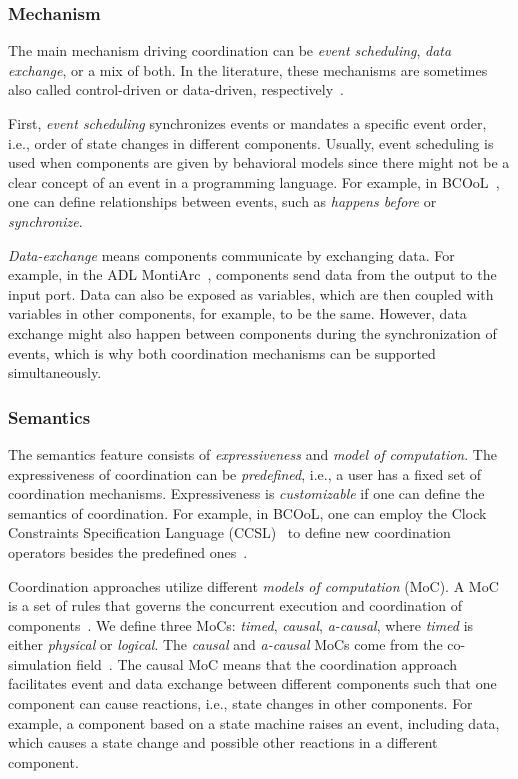 \documentclass[runningheads]{llncs}
\begin{document}
\subsubsection{Mechanism} The main mechanism driving coordination can be \textit{event scheduling}, \textit{data exchange}, or a mix of both.
In the literature, these mechanisms are sometimes also called control-driven or data-driven, respectively~\cite{papadopoulosCoordinationModelsLanguages1998,varalarsenBCOolBehavioralCoordination2016}.

First, \textit{event scheduling} synchronizes events or mandates a specific event order, i.e., order of state changes in different components.
Usually, event scheduling is used when components are given by behavioral models since there might not be a clear concept of an event in a programming language.
For example, in BCOoL~\cite{varalarsenBehavioralCoordinationOperator2015}, one can define relationships between events, such as \textit{happens before} or \textit{synchronize}.

\textit{Data-exchange} means components communicate by exchanging data.
For example, in the ADL MontiArc~\cite{haberMontiArcArchitecturalModeling2014}, components send data from the output to the input port.
Data can also be exposed as variables, which are then coupled with variables in other components, for example, to be the same. %
However, data exchange might also happen between components during the synchronization of events, which is why both coordination mechanisms can be supported simultaneously.

\subsubsection{Semantics} The semantics feature consists of \textit{expressiveness} and \textit{model of computation}.
The expressiveness of coordination can be \textit{predefined}, i.e., a user has a fixed set of coordination mechanisms.
Expressiveness is \textit{customizable} if one can define the semantics of coordination.
For example, in BCOoL, one can employ the Clock Constraints Specification Language (CCSL)~\cite{andreSyntaxSemanticsClock2009} to define new coordination operators besides the predefined ones~\cite{varalarsenBCOolBehavioralCoordination2016,varalarsenBehavioralCoordinationOperator2015}.

Coordination approaches utilize different \textit{models of computation} (MoC).
A MoC is a set of rules that governs the concurrent execution and coordination of components~\cite{ptolemaeusSystemDesignModeling2014}.
We define three MoCs: \textit{timed}, \textit{causal}, \textit{a-causal}, where \textit{timed} is either \textit{physical} or \textit{logical}.
The \textit{causal} and \textit{a-causal} MoCs come from the co-simulation field~\cite{gomesCoSimulationSurvey2019}.
The causal MoC means that the coordination approach facilitates event and data exchange between different components such that one component can cause reactions, i.e., state changes in other components.
For example, a component based on a state machine raises an event, including data, which causes a state change and possible other reactions in a different component.
\end{document}
